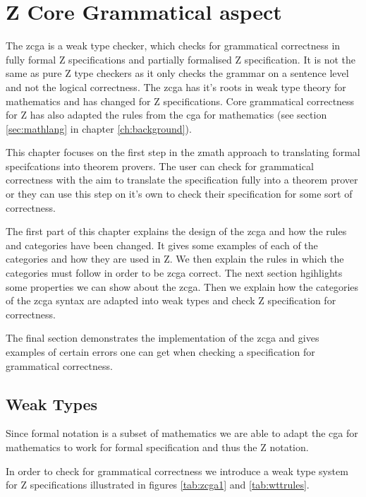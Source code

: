 \chapter{Z Core Grammatical aspect}
\label{ch:zcga}

The \gls{zcga} is a weak type checker, which checks for grammatical correctness in fully formal Z specifications and partially formalised Z specification. It is not the same as pure Z type checkers as it only checks the grammar on a sentence level and not the logical correctness. The \gls{zcga} has it's roots in weak type theory for mathematics \cite{wtt} and has changed for Z specifications. Core grammatical correctness for Z has also adapted the rules from the \gls{cga} for mathematics (see section \ref{sec:mathlang} in chapter \ref{ch:background}).

This chapter focuses on the first step in the \gls{zmath} approach to translating formal specifcations into theorem provers. The user can check for grammatical correctness with the aim to translate the specification fully into a theorem prover or they can use this step on it's own to check their specification for some sort of correctness.

The first part of this chapter explains the design of the \gls{zcga} and how the rules and categories have been changed. It gives some examples of each of the categories and how they are used in Z. We then explain the rules in which the categories must follow in order to be \gls{zcga} correct. The next section hgihlights some properties we can show about the \gls{zcga}. Then we explain how the categories of the \gls{zcga} syntax are adapted into weak types and check Z specification for correctness.

The final section demonstrates the implementation of the \gls{zcga} and gives examples of certain errors one can get when checking a specification for grammatical correctness.

\section{Weak Types}

Since formal notation is a subset of mathematics we are able to adapt the \gls{cga} for mathematics to work for formal specification and thus the Z notation.

In order to check for grammatical correctness we introduce a weak type system for Z specifications illustrated in figures \ref{tab:zcga1} and \ref{tab:wttrules}.
 
